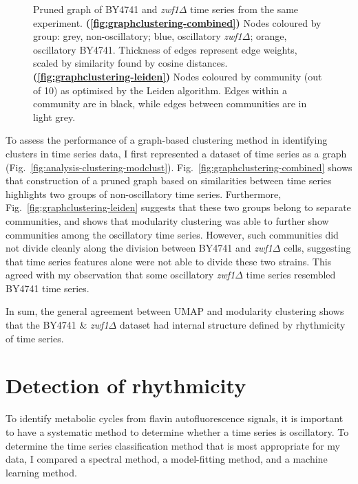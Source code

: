 \begin{figure}[htbp]
  \caption[
    Pruned graph of BY4741 and \textit{zwf1$\Delta$} time series from the same experiment.
  ]{
    Pruned graph of BY4741 and \textit{zwf1$\Delta$} time series from the same experiment.
    \textbf{(\ref{fig:graphclustering-combined})}
    Nodes coloured by group: grey, non-oscillatory; blue, oscillatory \textit{zwf1$\Delta$}; orange, oscillatory BY4741.
    Thickness of edges represent edge weights, scaled by similarity found by cosine distances.
    \textbf{(\ref{fig:graphclustering-leiden})}
    Nodes coloured by community (out of 10) as optimised by the Leiden algorithm.
    Edges within a community are in black, while edges between communities are in light grey.
  }
  \label{fig:graphclustering}
\end{figure}


To assess the performance of a graph-based clustering method in identifying clusters in time series data, I first represented a dataset of time series as a graph (Fig.\ \ref{fig:analysis-clustering-modclust}).
Fig.\ \ref{fig:graphclustering-combined} shows that construction of a pruned graph based on similarities between time series highlights two groups of non-oscillatory time series.
Furthermore, Fig.\ \ref{fig:graphclustering-leiden} suggests that these two groups belong to separate communities, and shows that modularity clustering was able to further show communities among the oscillatory time series.
However, such communities did not divide cleanly along the division between BY4741 and \textit{zwf1$\Delta$} cells, suggesting that time series features alone were not able to divide these two strains.
This agreed with my observation that some oscillatory \textit{zwf1$\Delta$} time series resembled BY4741 time series.


In sum, the general agreement between UMAP and modularity clustering shows that the BY4741 \& \textit{zwf1$\Delta$} dataset had internal structure defined by rhythmicity of time series.


\section{Detection of rhythmicity}
\label{sec:analysis-classification}

To identify metabolic cycles from flavin autofluorescence signals, it is important to have a systematic method to determine whether a time series is oscillatory.
To determine the time series classification method that is most appropriate for my data, I compared a spectral method, a model-fitting method, and a machine learning method.


